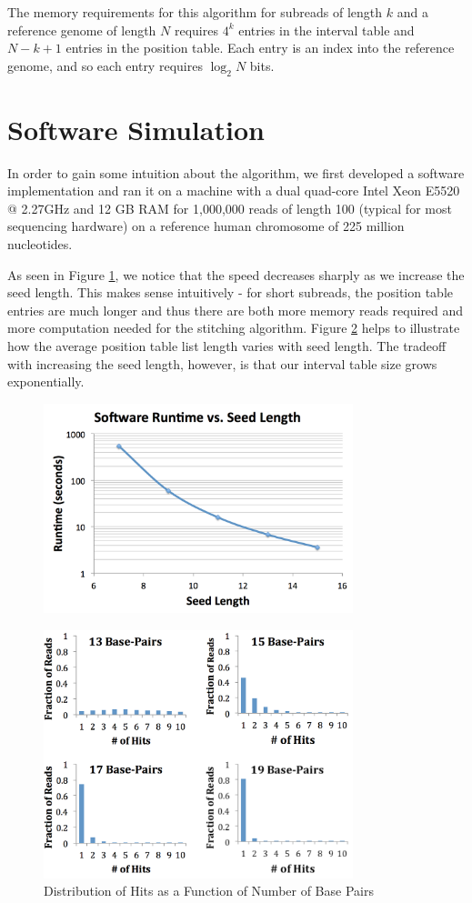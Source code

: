 \documentclass[11pt]{article}
\begin{document}
The memory requirements for this algorithm for subreads of length $k$ and a reference genome of length $N$ requires $4^k$ entries in the interval table and $N-k+1$ entries in the position table. Each entry is an index into the reference genome, and so each entry requires $\log_2 N$ bits.

\section{Software Simulation}

In order to gain some intuition about the algorithm, we first developed a software implementation and ran it on a machine with a dual quad-core Intel Xeon E5520 @ 2.27GHz and 12 GB RAM for 1,000,000 reads of length 100 (typical for most sequencing hardware) on a reference human chromosome of 225 million nucleotides.


As seen in Figure \ref{speedvsseedlen}, we notice that the speed decreases sharply as we increase the seed length. This makes sense intuitively - for short subreads, the position table entries are much longer and thus there are both more memory reads required and more computation needed for the stitching algorithm.  Figure \ref{histogram} helps to illustrate how the average position table list length varies with seed length. The tradeoff with increasing the seed length, however, is that our interval table size grows exponentially.
\begin{figure}[ht!]
\centering
\includegraphics[width=90mm]{swruntime.png}
\caption{}
\label{speedvsseedlen}
\end{figure}

\begin{figure}[ht!]
\centering
\includegraphics[width=90mm]{readsvhits.png}
\caption{Distribution of Hits as a Function of Number of Base Pairs}
\label{histogram}
\end{figure}
\end{document}
